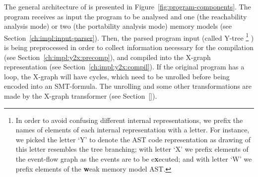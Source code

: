 The general architecture of \porthos[2] is presented in Figure~\ref{fig:program-components}.
The program receives as input the program to be analysed and one (the reachability analysis mode) or two (the portability analysis mode) memory models (see Section~\ref{ch:impl:input-parser}).
Then, the parsed program input (called Y-tree%
\footnote{In order to avoid confusing different internal representations, we prefix the names of elements of each internal representation with a letter. For instance, we picked the letter `Y' to denote the AST code representation as drawing of this letter resembles the tree branching; with letter `X' we prefix elements of the event-flow graph as the events are to be e\textbf{x}ecuted; and with letter `W' we prefix elements of the \textbf{w}eak memory model AST.}%
) is being preprocessed in order to collect information necessary for the compilation (see Section~\ref{ch:impl:y2x:precomp}), and compiled into the X-graph representation (see Section~\ref{ch:impl:y2x:compil}).
If the original program has a loop, the X-graph will have cycles, which need to be unrolled before being encoded into an SMT-formula. The unrolling and some other transformations are made by the X-graph transformer (see Section~\ref{}).

